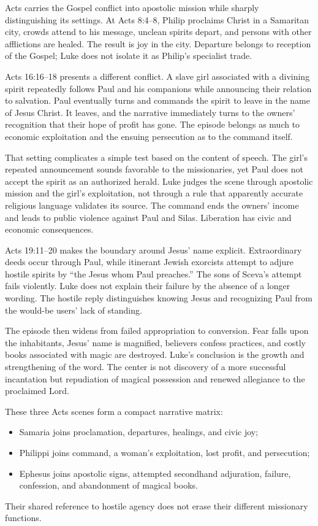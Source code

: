 Acts carries the Gospel conflict into apostolic mission while sharply
distinguishing its settings. At Acts 8:4--8, Philip proclaims Christ in a
Samaritan city, crowds attend to his message, unclean spirits depart, and
persons with other afflictions are healed. The result is joy in the city.
Departure belongs to reception of the Gospel; Luke does not isolate it as
Philip's specialist trade.

Acts 16:16--18 presents a different conflict. A slave girl associated with a
divining spirit repeatedly follows Paul and his companions while announcing
their relation to salvation. Paul eventually turns and commands the spirit
to leave in the name of Jesus Christ. It leaves, and the narrative immediately
turns to the owners' recognition that their hope of profit has gone. The
episode belongs as much to economic exploitation and the ensuing persecution
as to the command itself.

That setting complicates a simple test based on the content of speech. The
girl's repeated announcement sounds favorable to the missionaries, yet Paul
does not accept the spirit as an authorized herald. Luke judges the scene
through apostolic mission and the girl's exploitation, not through a rule
that apparently accurate religious language validates its source. The command
ends the owners' income and leads to public violence against Paul and Silas.
Liberation has civic and economic consequences.

Acts 19:11--20 makes the boundary around Jesus' name explicit. Extraordinary
deeds occur through Paul, while itinerant Jewish exorcists attempt to adjure
hostile spirits by ``the Jesus whom Paul preaches.'' The sons of Sceva's
attempt fails violently. Luke does not explain their failure by the absence
of a longer wording. The hostile reply distinguishes knowing Jesus and
recognizing Paul from the would-be users' lack of standing.

The episode then widens from failed appropriation to conversion. Fear falls
upon the inhabitants, Jesus' name is magnified, believers confess practices,
and costly books associated with magic are destroyed. Luke's conclusion is
the growth and strengthening of the word. The center is not discovery of a
more successful incantation but repudiation of magical possession and renewed
allegiance to the proclaimed Lord.

These three Acts scenes form a compact narrative matrix:
\begin{itemize}
  \item Samaria joins proclamation, departures, healings, and civic joy;
  \item Philippi joins command, a woman's exploitation, lost profit, and
        persecution;
  \item Ephesus joins apostolic signs, attempted secondhand adjuration,
        failure, confession, and abandonment of magical books.
\end{itemize}
Their shared reference to hostile agency does not erase their different
missionary functions.

